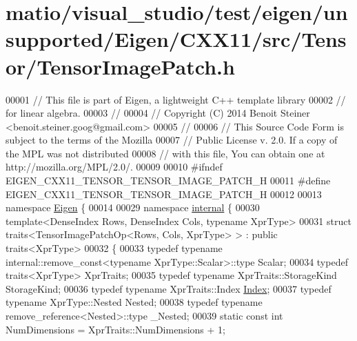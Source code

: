 \hypertarget{matio_2visual__studio_2test_2eigen_2unsupported_2_eigen_2_c_x_x11_2src_2_tensor_2_tensor_image_patch_8h_source}{}\section{matio/visual\+\_\+studio/test/eigen/unsupported/\+Eigen/\+C\+X\+X11/src/\+Tensor/\+Tensor\+Image\+Patch.h}
\label{matio_2visual__studio_2test_2eigen_2unsupported_2_eigen_2_c_x_x11_2src_2_tensor_2_tensor_image_patch_8h_source}

\begin{DoxyCode}
00001 \textcolor{comment}{// This file is part of Eigen, a lightweight C++ template library}
00002 \textcolor{comment}{// for linear algebra.}
00003 \textcolor{comment}{//}
00004 \textcolor{comment}{// Copyright (C) 2014 Benoit Steiner <benoit.steiner.goog@gmail.com>}
00005 \textcolor{comment}{//}
00006 \textcolor{comment}{// This Source Code Form is subject to the terms of the Mozilla}
00007 \textcolor{comment}{// Public License v. 2.0. If a copy of the MPL was not distributed}
00008 \textcolor{comment}{// with this file, You can obtain one at http://mozilla.org/MPL/2.0/.}
00009 
00010 \textcolor{preprocessor}{#ifndef EIGEN\_CXX11\_TENSOR\_TENSOR\_IMAGE\_PATCH\_H}
00011 \textcolor{preprocessor}{#define EIGEN\_CXX11\_TENSOR\_TENSOR\_IMAGE\_PATCH\_H}
00012 
00013 \textcolor{keyword}{namespace }\hyperlink{namespace_eigen}{Eigen} \{
00014 
00029 \textcolor{keyword}{namespace }\hyperlink{namespaceinternal}{internal} \{
00030 \textcolor{keyword}{template}<DenseIndex Rows, DenseIndex Cols, \textcolor{keyword}{typename} XprType>
00031 \textcolor{keyword}{struct }traits<TensorImagePatchOp<Rows, Cols, XprType> > : \textcolor{keyword}{public} traits<XprType>
00032 \{
00033   \textcolor{keyword}{typedef} \textcolor{keyword}{typename} internal::remove\_const<typename XprType::Scalar>::type Scalar;
00034   \textcolor{keyword}{typedef} traits<XprType> XprTraits;
00035   \textcolor{keyword}{typedef} \textcolor{keyword}{typename} XprTraits::StorageKind StorageKind;
00036   \textcolor{keyword}{typedef} \textcolor{keyword}{typename} XprTraits::Index \hyperlink{namespace_eigen_a62e77e0933482dafde8fe197d9a2cfde}{Index};
00037   \textcolor{keyword}{typedef} \textcolor{keyword}{typename} XprType::Nested Nested;
00038   \textcolor{keyword}{typedef} \textcolor{keyword}{typename} remove\_reference<Nested>::type \_Nested;
00039   \textcolor{keyword}{static} \textcolor{keyword}{const} \textcolor{keywordtype}{int} NumDimensions = XprTraits::NumDimensions + 1;

\end{DoxyCode}
